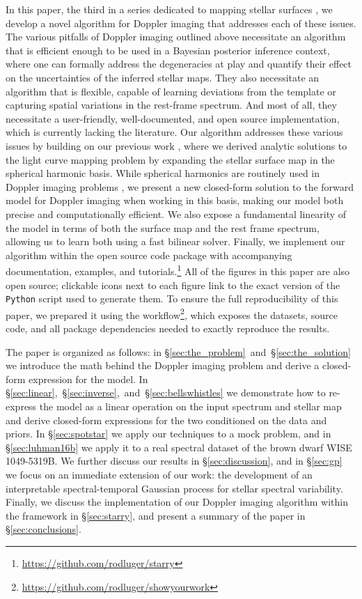 \documentclass[modern]{aastex631}
\begin{document}
In this paper, the third in a series dedicated to mapping stellar surfaces \citep{Luger2021a,Luger2021b}, we develop a novel algorithm for Doppler imaging that addresses each of these issues.
The various pitfalls of Doppler imaging outlined above necessitate an algorithm that is efficient enough to be used in a Bayesian posterior inference context, where one can formally address the degeneracies at play and quantify their effect on the uncertainties of the inferred stellar maps.
They also necessitate an algorithm that is flexible, capable of learning deviations from the template or capturing spatial variations in the rest-frame spectrum.
And most of all, they necessitate a user-friendly, well-documented, and open source implementation, which is currently lacking the literature.
Our algorithm addresses these various issues by building on our previous work \citep{Luger2019}, where we derived analytic solutions to the light curve mapping problem by expanding the stellar surface map in the spherical harmonic basis.
While spherical harmonics are routinely used in Doppler imaging problems \citep{Deutsch1958,Deutsch1970,Falk1974,Donati2006,Kochukhov2014}, we present a new closed-form solution to the forward model for Doppler imaging when working in this basis, making our model both precise and computationally efficient.
We also expose a fundamental linearity of the model in terms of both the surface map and the rest frame spectrum, allowing us to learn both using a fast bilinear solver.
Finally, we implement our algorithm within the open source \starry code package with accompanying documentation, examples, and tutorials.\footnote{\url{https://github.com/rodluger/starry}}
All of the figures in this paper are also open source; clickable \faGithub icons next to each figure link to the exact version of the \texttt{Python} script used to generate them.
To ensure the full reproducibility of this paper, we prepared it using the \showyourwork workflow\footnote{\url{https://github.com/rodluger/showyourwork}}, which exposes the datasets, source code, and all package dependencies needed to exactly reproduce the results.

The paper is organized as follows: in \S\ref{sec:the_problem}~and~\S\ref{sec:the_solution} we introduce the math behind the Doppler imaging problem and derive a closed-form expression for the model. 
In \S\ref{sec:linear},~\S\ref{sec:inverse},~and~\S\ref{sec:bellswhistles} we demonstrate how to re-express the model as a linear operation on the input spectrum and stellar map and derive closed-form expressions for the two conditioned on the data and priors.
In \S\ref{sec:spotstar} we apply our techniques to a mock problem, and in \S\ref{sec:luhman16b} we apply it to a real spectral dataset of the brown dwarf WISE 1049-5319B.
We further discuss our results in \S\ref{sec:discussion}, and in \S\ref{sec:gp} we focus on an immediate extension of our work: the development of an interpretable spectral-temporal Gaussian process for stellar spectral variability.
Finally, we discuss the implementation of our Doppler imaging algorithm within the \starry framework in \S\ref{sec:starry}, and present a summary of the paper in \S\ref{sec:conclusions}. 
\end{document}

